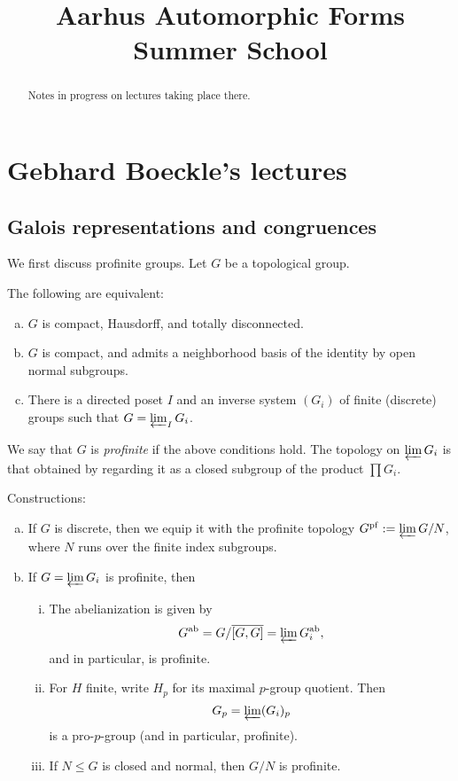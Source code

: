 \documentclass[reqno]{amsart} 
\begin{document}
\title{Aarhus Automorphic Forms Summer School}

\begin{abstract}
  Notes in progress on lectures taking place there.
\end{abstract}

\section{Gebhard Boeckle's lectures}
\subsection{Galois representations and congruences}

We first discuss profinite groups.  Let $G$ be a topological group.

\begin{theorem}
  The following are equivalent:
  \begin{enumerate}[(a)]
  \item\label{enumerate:cq6r3e8dsb} $G$ is compact, Hausdorff, and totally disconnected.
  \item\label{enumerate:cq6r3e8eqf} $G$ is compact, and admits a neighborhood basis of the identity by open normal subgroups.
  \item\label{enumerate:cq6r3e8f6g} There is a directed poset $I$ and an inverse system $(G_i)$ of finite (discrete) groups such that $G = \varprojlim_I G_i$.
  \end{enumerate}
\end{theorem}
We say that $G$ is \emph{profinite} if the above conditions hold.  The topology on $\varprojlim G_i$ is that obtained by regarding it as a closed subgroup of the product $\prod G_i$.

Constructions:
\begin{enumerate}[(a)]
\item\label{enumerate:cq6r3e8b0y} If $G$ is discrete, then we equip it with the profinite topology $G^{\mathrm{pf}} := \varprojlim G / N$, where $N$ runs over the finite index subgroups.
\item\label{enumerate:cq6r3e8cou} If $G = \varprojlim G_i$ is profinite, then
  \begin{enumerate}[(i)]
  \item\label{enumerate:cq6r3fehbe} The abelianization is given by
    \begin{equation*}
      G^{\mathrm{ab}} = G / \overline{[G, G]} = \varprojlim G_i^{\mathrm{ab}},
    \end{equation*}
    and in particular, is profinite.
  \item\label{enumerate:cq6r3feivc} For $H$ finite, write $H_p$ for its maximal $p$-group quotient.  Then
    \begin{equation*}
      G_p = \varprojlim(G_i)_p
    \end{equation*}
    is a pro-$p$-group (and in particular, profinite).
  \item\label{enumerate:cq6r3fej61} If $N \leq G$ is closed and normal, then $G /N$ is profinite.
  \end{enumerate}
\end{enumerate}
\end{document}
